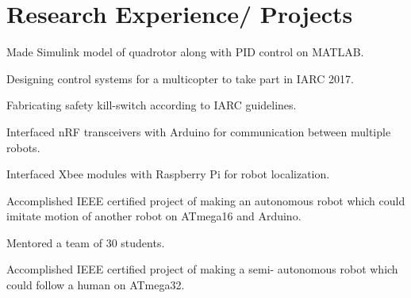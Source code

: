 \documentclass[letterpaper]{aman}
\begin{document}
\begin{minipage}[t]{0.599\textwidth} 



\section{Research Experience/ Projects}

\vspace{\topsep}
\begin{tightemize}
\item Made Simulink model of quadrotor along with PID control on MATLAB.
\item Designing control systems for a multicopter to take part in IARC 2017.
\item Fabricating safety kill-switch according to IARC guidelines.
\end{tightemize}
\sectionsep

\begin{tightemize}
\item Interfaced nRF transceivers with Arduino for communication between multiple robots.
\item Interfaced Xbee modules with Raspberry Pi for robot localization.
\end{tightemize}
\sectionsep

\begin{tightemize}
\item Accomplished IEEE certified project of making an autonomous robot which could imitate motion of another robot on ATmega16 and Arduino.
\item Mentored a team of 30 students.
\end{tightemize}
\sectionsep

\begin{tightemize}
\item Accomplished IEEE certified project of making a semi- autonomous robot which could follow a human on ATmega32.
\end{tightemize}
\sectionsep


\end{minipage}
\end{document}
